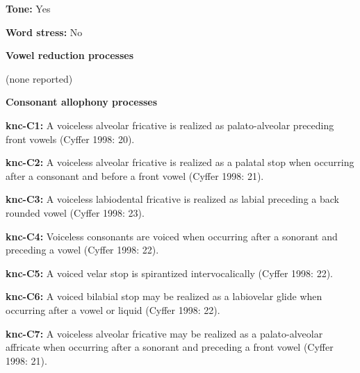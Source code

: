 \begin{styleBody}
\textbf{Tone:} Yes
\end{styleBody}

\begin{styleBody}
\textbf{Word stress:} No
\end{styleBody}

\begin{styleBody}
\textbf{Vowel reduction processes}
\end{styleBody}

\begin{styleBody}
(none reported)
\end{styleBody}

\begin{styleBody}
\textbf{Consonant allophony processes}
\end{styleBody}

\begin{styleBody}
\textbf{knc-C1: }A voiceless alveolar fricative is realized as palato-alveolar preceding front vowels (Cyffer 1998: 20).
\end{styleBody}

\begin{styleBody}
\textbf{knc-C2: }A voiceless alveolar fricative is realized as a palatal stop when occurring after a consonant and before a front vowel (Cyffer 1998: 21).
\end{styleBody}

\begin{styleBody}
\textbf{knc-C3: }A voiceless labiodental fricative is realized as labial preceding a back rounded vowel (Cyffer 1998: 23).
\end{styleBody}

\begin{styleBody}
\textbf{knc-C4: }Voiceless consonants are voiced when occurring after a sonorant and preceding a vowel (Cyffer 1998: 22).
\end{styleBody}

\begin{styleBody}
\textbf{knc-C5: }A voiced velar stop is spirantized intervocalically (Cyffer 1998: 22).
\end{styleBody}

\begin{styleBody}
\textbf{knc-C6: }A voiced bilabial stop may be realized as a labiovelar glide when occurring after a vowel or liquid (Cyffer 1998: 22).
\end{styleBody}

\begin{styleBody}
\textbf{knc-C7: }A voiceless alveolar fricative may be realized as a palato-alveolar affricate when occurring after a sonorant and preceding a front vowel (Cyffer 1998: 21).
\end{styleBody}

